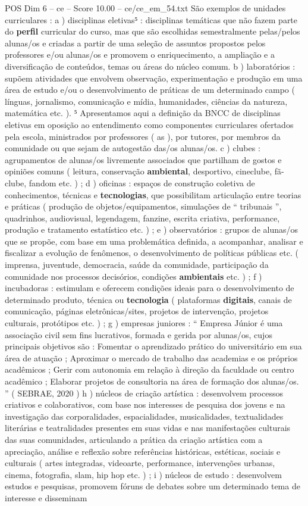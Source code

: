 \begin{textsample}{POS Dim 6 – ce – Score 10.00 – ce/ce\_em\_54.txt}
São exemplos de unidades curriculares : a ) disciplinas eletivas⁵ : disciplinas temáticas que não fazem parte do \textbf{perfil} curricular do curso, mas que são escolhidas semestralmente pelas/pelos alunas/os e criadas a partir de uma seleção de assuntos propostos pelos professores e/ou alunas/os e promovem o enriquecimento, a ampliação e a diversificação de conteúdos, temas ou áreas do núcleo comum. b ) laboratórios : supõem atividades que envolvem observação, experimentação e produção em uma área de estudo e/ou o desenvolvimento de práticas de um determinado campo ( línguas, jornalismo, comunicação e mídia, humanidades, ciências da natureza, matemática etc. ). ⁵ Apresentamos aqui a definição da BNCC de disciplinas eletivas em oposição ao entendimento como componentes curriculares ofertados pela escola, ministrados por professores ( as ), por tutores, por membros da comunidade ou que sejam de autogestão das/os alunas/os. c ) clubes : agrupamentos de alunas/os livremente associados que partilham de gostos e opiniões comuns ( leitura, conservação \textbf{ambiental}, desportivo, cineclube, fã-clube, fandom etc. ) ; d ) oficinas : espaços de construção coletiva de conhecimentos, técnicas e \textbf{tecnologias}, que possibilitam articulação entre teorias e práticas ( produção de objetos/equipamentos, simulações de “ tribunais ”, quadrinhos, audiovisual, legendagem, fanzine, escrita criativa, performance, produção e tratamento estatístico etc. ) ; e ) observatórios : grupos de alunas/os que se propõe, com base em uma problemática definida, a acompanhar, analisar e fiscalizar a evolução de fenômenos, o desenvolvimento de políticas públicas etc. ( imprensa, juventude, democracia, saúde da comunidade, participação da comunidade nos processos decisórios, condições \textbf{ambientais} etc. ) ; f ) incubadoras : estimulam e oferecem condições ideais para o desenvolvimento de determinado produto, técnica ou \textbf{tecnologia} ( plataformas \textbf{digitais}, canais de comunicação, páginas eletrônicas/sites, projetos de intervenção, projetos culturais, protótipos etc. ) ; g ) empresas juniores : “ Empresa Júnior é uma associação civil sem fins lucrativos, formada e gerida por alunas/os, cujos principais objetivos são : Fomentar o aprendizado prático do universitário em sua área de atuação ; Aproximar o mercado de trabalho das academias e os próprios acadêmicos ; Gerir com autonomia em relação à direção da faculdade ou centro acadêmico ; Elaborar projetos de consultoria na área de formação dos alunas/os. ” ( SEBRAE, 2020 ) h ) núcleos de criação artística : desenvolvem processos criativos e colaborativos, com base nos interesses de pesquisa dos jovens e na investigação das corporalidades, espacialidades, musicalidades, textualidades literárias e teatralidades presentes em suas vidas e nas manifestações culturais das suas comunidades, articulando a prática da criação artística com a apreciação, análise e reflexão sobre referências históricas, estéticas, sociais e culturais ( artes integradas, videoarte, performance, intervenções urbanas, cinema, fotografia, slam, hip hop etc. ) ; i ) núcleos de estudo : desenvolvem estudos e pesquisas, promovem fóruns de debates sobre um determinado tema de interesse e disseminam 
\end{textsample}
